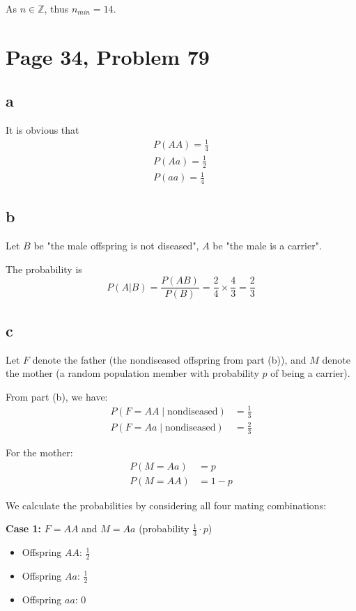 \documentclass[a4paper, UTF-8]{article}
\theoremstyle{plain}
\begin{document}
As $n \in \mathbb{Z}$, thus $n_{min} = 14$.

\section{Page 34, Problem 79}

\subsection{a} 

It is obvious that 
\begin{align*} 
P(AA) = \frac{1}{4} \\
P(Aa) = \frac{1}{2} \\ 
P(aa) = \frac{1}{4} 
\end{align*} 

\subsection{b} 

Let $B$ be "the male offspring is not diseased", $A$ be "the male is a carrier".

The probability is 
$$
P(A|B) = \frac{P(AB)}{P(B)} = \frac{2}{4} \times \frac{4}{3} = \frac{2}{3}
$$

\subsection{c} 

Let $F$ denote the father (the nondiseased offspring from part (b)), and $M$ denote the mother (a random population member with probability $p$ of being a carrier).

From part (b), we have:
\begin{align*}
P(F = AA \mid \text{nondiseased}) &= \frac{1}{3} \\
P(F = Aa \mid \text{nondiseased}) &= \frac{2}{3}
\end{align*}

For the mother:
\begin{align*}
P(M = Aa) &= p \\
P(M = AA) &= 1-p
\end{align*}

We calculate the probabilities by considering all four mating combinations:

\textbf{Case 1:} $F = AA$ and $M = Aa$ (probability $\frac{1}{3} \cdot p$)
\begin{itemize}
    \item Offspring $AA$: $\frac{1}{2}$
    \item Offspring $Aa$: $\frac{1}{2}$
    \item Offspring $aa$: $0$
\end{itemize}
\end{document}
